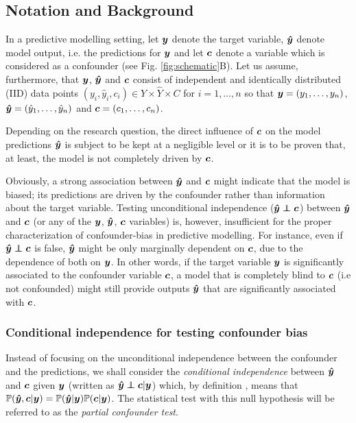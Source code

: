 \documentclass{article}
\begin{document}
\subsection{Notation and Background}

In a predictive modelling setting, let $\boldsymbol{y}$ denote the target variable, $\boldsymbol{\hat{y}}$ denote model output, i.e. the predictions for $\boldsymbol{y}$ and let $\boldsymbol{c}$ denote a variable which is considered as a confounder (see Fig. \ref{fig:schematic}B). Let us assume, furthermore, that $\boldsymbol{y}$, $\boldsymbol{\hat{y}}$ and $\boldsymbol{c}$ consist of independent and identically distributed (IID) data points $(y_i, \hat{y}_i, c_i) \in Y \times \hat{Y} \times C$ for $i=1, \dots , n$ so that $\boldsymbol{y}=(y_1, \dots ,y_n)$, $\boldsymbol{\hat{y}}=(\hat{y}_1, \dots, \hat{y}_n)$ and $\boldsymbol{c}=(c_1, \dots, c_n)$. 

Depending on the research question, the direct influence of $\boldsymbol{c}$ on the model predictions $\boldsymbol{\hat{y}}$ is subject to be kept at a negligible level or it is to be proven that, at least, the model is not completely driven by $\boldsymbol{c}$.

Obviously, a strong association between $\boldsymbol{\hat{y}}$ and $\boldsymbol{c}$ might indicate that the model is biased; its predictions are driven by the confounder rather than information about the target variable.
Testing unconditional independence ($\yhat \independent \c$) between $\boldsymbol{\hat{y}}$ and $\boldsymbol{c}$ (or any of the $\boldsymbol{y}$, $\boldsymbol{\hat{y}}$, $\boldsymbol{c}$ variables) is, however, insufficient for the proper characterization of confounder-bias in predictive modelling.
For instance, even if $\yhat \independent \c$ is false, $\boldsymbol{\hat{y}}$ might be only marginally dependent on $\boldsymbol{c}$, due to the dependence of both on $\boldsymbol{y}$. In other words, if the target variable $\boldsymbol{y}$ is significantly associated to the confounder variable $\boldsymbol{c}$, a model that is completely blind to $\boldsymbol{c}$ (i.e not confounded) might still provide outputs $\boldsymbol{\hat{y}}$ that are significantly associated with $\boldsymbol{c}$.

\subsubsection*{Conditional independence for testing confounder bias}

Instead of focusing on the unconditional independence between the confounder and the predictions, we shall consider the \emph{conditional independence} between $\boldsymbol{\hat{y}}$ and $\boldsymbol{c}$ given $\boldsymbol{y}$ (written as $\yhat \independent \c | \y$) which, by definition  \citep{dawid1979conditional}, means that $\mathbb{P}(\boldsymbol{\hat{y}}, \boldsymbol{c}|\boldsymbol{y}) = \mathbb{P}(\boldsymbol{\hat{y}}|\boldsymbol{y})\mathbb{P}(\boldsymbol{c}|\boldsymbol{y})$. The statistical test with this null hypothesis will be referred to as the \emph{partial confounder test}.
\end{document}
